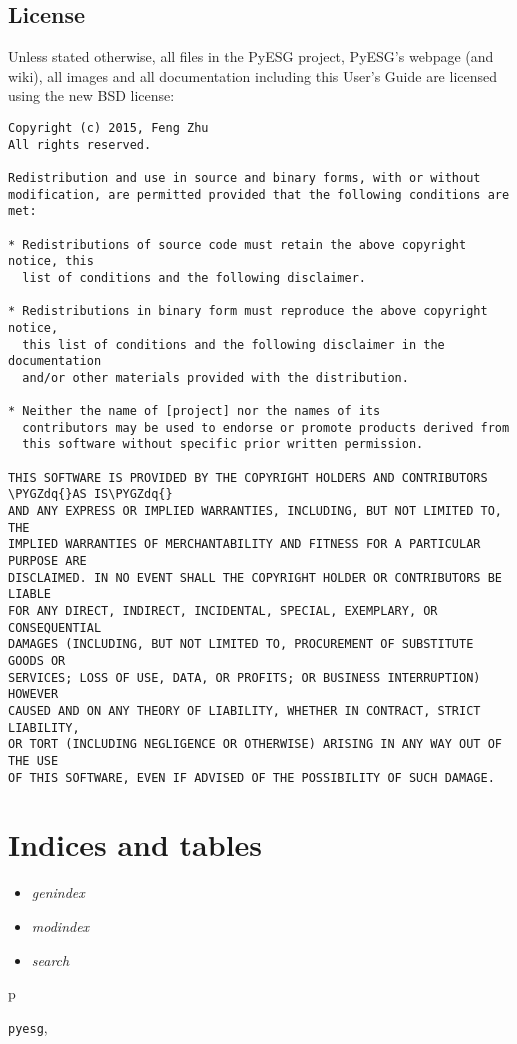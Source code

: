 \documentclass[letterpaper,10pt,english]{sphinxmanual}
\def\PYGZdq{\char`\"}
\begin{document}
\section{License}
\label{about:license}
Unless stated otherwise, all files in the PyESG project, PyESG’s webpage (and wiki),
all images and all documentation including this User’s Guide are licensed using the
new BSD license:

\begin{Verbatim}[commandchars=\\\{\}]
Copyright (c) 2015, Feng Zhu
All rights reserved.

Redistribution and use in source and binary forms, with or without
modification, are permitted provided that the following conditions are met:

* Redistributions of source code must retain the above copyright notice, this
  list of conditions and the following disclaimer.

* Redistributions in binary form must reproduce the above copyright notice,
  this list of conditions and the following disclaimer in the documentation
  and/or other materials provided with the distribution.

* Neither the name of [project] nor the names of its
  contributors may be used to endorse or promote products derived from
  this software without specific prior written permission.

THIS SOFTWARE IS PROVIDED BY THE COPYRIGHT HOLDERS AND CONTRIBUTORS \PYGZdq{}AS IS\PYGZdq{}
AND ANY EXPRESS OR IMPLIED WARRANTIES, INCLUDING, BUT NOT LIMITED TO, THE
IMPLIED WARRANTIES OF MERCHANTABILITY AND FITNESS FOR A PARTICULAR PURPOSE ARE
DISCLAIMED. IN NO EVENT SHALL THE COPYRIGHT HOLDER OR CONTRIBUTORS BE LIABLE
FOR ANY DIRECT, INDIRECT, INCIDENTAL, SPECIAL, EXEMPLARY, OR CONSEQUENTIAL
DAMAGES (INCLUDING, BUT NOT LIMITED TO, PROCUREMENT OF SUBSTITUTE GOODS OR
SERVICES; LOSS OF USE, DATA, OR PROFITS; OR BUSINESS INTERRUPTION) HOWEVER
CAUSED AND ON ANY THEORY OF LIABILITY, WHETHER IN CONTRACT, STRICT LIABILITY,
OR TORT (INCLUDING NEGLIGENCE OR OTHERWISE) ARISING IN ANY WAY OUT OF THE USE
OF THIS SOFTWARE, EVEN IF ADVISED OF THE POSSIBILITY OF SUCH DAMAGE.
\end{Verbatim}


\chapter{Indices and tables}
\label{index:indices-and-tables}\begin{itemize}
\item {} 
\emph{genindex}

\item {} 
\emph{modindex}

\item {} 
\emph{search}

\end{itemize}


\renewcommand{\indexname}{Python Module Index}
\begin{theindex}
\def\bigletter#1{{\Large\sffamily#1}\nopagebreak\vspace{1mm}}
\bigletter{p}
\item {\texttt{pyesg}}, \pageref{code:module-pyesg}
\end{theindex}

\renewcommand{\indexname}{Index}
\printindex
\end{document}
